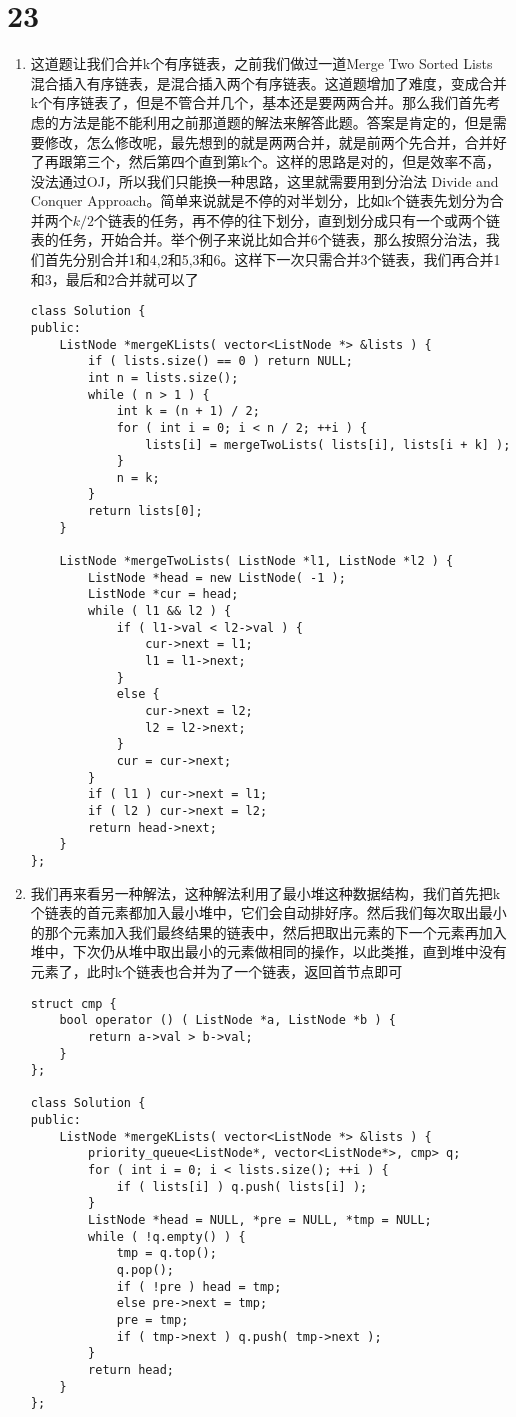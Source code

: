 \documentclass[12pt,a4paper]{article}
\begin{document}
\section{23}
\begin{enumerate}
\item
\begin{CJK}{UTF8}{gbsn}
这道题让我们合并k个有序链表，之前我们做过一道Merge Two Sorted Lists 混合插入有序链表，是混合插入两个有序链表。这道题增加了难度，变成合并k个有序链表了，但是不管合并几个，基本还是要两两合并。那么我们首先考虑的方法是能不能利用之前那道题的解法来解答此题。答案是肯定的，但是需要修改，怎么修改呢，最先想到的就是两两合并，就是前两个先合并，合并好了再跟第三个，然后第四个直到第k个。这样的思路是对的，但是效率不高，没法通过OJ，所以我们只能换一种思路，这里就需要用到分治法 Divide and Conquer Approach。简单来说就是不停的对半划分，比如k个链表先划分为合并两个$k/2$个链表的任务，再不停的往下划分，直到划分成只有一个或两个链表的任务，开始合并。举个例子来说比如合并6个链表，那么按照分治法，我们首先分别合并1和4,2和5,3和6。这样下一次只需合并3个链表，我们再合并1和3，最后和2合并就可以了
\end{CJK}
\begin{lstlisting}
class Solution {
public:
	ListNode *mergeKLists( vector<ListNode *> &lists ) {
		if ( lists.size() == 0 ) return NULL;
		int n = lists.size();
		while ( n > 1 ) {
			int k = (n + 1) / 2;
			for ( int i = 0; i < n / 2; ++i ) {
				lists[i] = mergeTwoLists( lists[i], lists[i + k] );
			}
			n = k;
		}
		return lists[0];
	}

	ListNode *mergeTwoLists( ListNode *l1, ListNode *l2 ) {
		ListNode *head = new ListNode( -1 );
		ListNode *cur = head;
		while ( l1 && l2 ) {
			if ( l1->val < l2->val ) {
				cur->next = l1;
				l1 = l1->next;
			}
			else {
				cur->next = l2;
				l2 = l2->next;
			}
			cur = cur->next;
		}
		if ( l1 ) cur->next = l1;
		if ( l2 ) cur->next = l2;
		return head->next;
	}
};
\end{lstlisting}
\item
\begin{CJK}{UTF8}{gbsn}
我们再来看另一种解法，这种解法利用了最小堆这种数据结构，我们首先把k个链表的首元素都加入最小堆中，它们会自动排好序。然后我们每次取出最小的那个元素加入我们最终结果的链表中，然后把取出元素的下一个元素再加入堆中，下次仍从堆中取出最小的元素做相同的操作，以此类推，直到堆中没有元素了，此时k个链表也合并为了一个链表，返回首节点即可
\end{CJK}
\begin{lstlisting}
struct cmp {
	bool operator () ( ListNode *a, ListNode *b ) {
		return a->val > b->val;
	}
};

class Solution {
public:
	ListNode *mergeKLists( vector<ListNode *> &lists ) {
		priority_queue<ListNode*, vector<ListNode*>, cmp> q;
		for ( int i = 0; i < lists.size(); ++i ) {
			if ( lists[i] ) q.push( lists[i] );
		}
		ListNode *head = NULL, *pre = NULL, *tmp = NULL;
		while ( !q.empty() ) {
			tmp = q.top();
			q.pop();
			if ( !pre ) head = tmp;
			else pre->next = tmp;
			pre = tmp;
			if ( tmp->next ) q.push( tmp->next );
		}
		return head;
	}
};
\end{lstlisting}
\end{enumerate}
\end{document}
